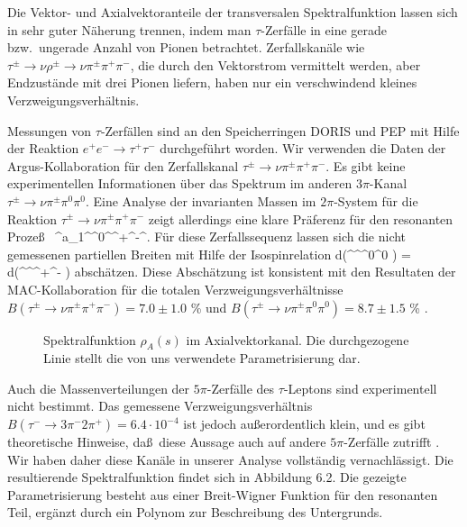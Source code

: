 Die Vektor- und Axialvektoranteile der transversalen 
Spektralfunktion lassen sich in sehr guter N\"aherung trennen, indem man 
$\tau$-Zerf\"alle in eine gerade bzw.~ungerade Anzahl von Pionen 
betrachtet. Zerfallskan\"ale wie $\tau^\pm\to\nu\rho^\pm\to
\nu\pi^\pm\pi^+\pi^-$, die durch den Vektorstrom vermittelt werden,
aber Endzust\"ande mit drei Pionen liefern, haben nur 
ein verschwindend kleines Verzweigungsverh\"altnis. 

Messungen von $\tau$-Zerf\"allen sind an den Speicherringen 
DORIS \cite{Alb86} und PEP \cite{Ruc86,Ban87} mit Hilfe
der Reaktion $e^+e^-\to\tau^+\tau^-$ durchgef\"uhrt worden.
Wir verwenden die Daten der Argus-Kollaboration \cite{Alb86}
f\"ur den Zerfallskanal $\tau^\pm\to\nu\pi^\pm\pi^+\pi^-$. 
Es gibt keine experimentellen Informationen \"uber das 
Spektrum im anderen $3\pi$-Kanal $\tau^\pm\to\nu\pi^\pm\pi^0\pi^0$.
Eine Analyse der invarianten Massen im $2\pi$-System f\"ur die
Reaktion $\tau^\pm\to\nu\pi^\pm\pi^+\pi^-$ \cite{Alb86}
zeigt allerdings eine klare Pr\"aferenz f\"ur den resonanten 
Proze\ss\
\be
  \tau^\pm\to \nu a_1^\pm \to \nu\rho^0\pi^\pm \to \nu\pi^+\pi^-\pi^\pm .
\ee
F\"ur diese Zerfallssequenz lassen sich die nicht gemessenen 
partiellen Breiten mit Hilfe der Isospinrelation 
\be
 d\Gamma (\tau^\pm\to\nu\pi^\pm\pi^0\pi^0 ) =
 d\Gamma (\tau^\pm\to\nu\pi^\pm\pi^+\pi^- ) 
\ee
absch\"atzen. Diese Absch\"atzung ist konsistent mit den Resultaten der 
MAC-Kollaboration \cite{Ban87} f\"ur die totalen Verzweigungsverh\"altnisse 
$B(\tau^\pm\to\nu\pi^\pm\pi^+\pi^-)=7.0\pm 1.0$ \% und $B(\tau^\pm\to\nu
\pi^\pm\pi^0\pi^0)=8.7\pm 1.5$ \% .
\begin{figure}
\caption{Spektralfunktion $\rho_A(s)$ im Axialvektorkanal.
Die durchgezogene Linie stellt die von uns verwendete 
Parametrisierung dar.}
\vspace{9cm}
\end{figure}

Auch die Massenverteilungen der $5\pi$-Zerf\"alle des $\tau$-Leptons
sind experimentell nicht bestimmt. Das gemessene Verzweigungsverh\"altnis
$B(\tau^-\to 3\pi^-2\pi^+)=6.4\cdot 10^{-4}$ \cite{Alb88} ist jedoch
au\ss erordentlich klein, und es gibt theoretische Hinweise, da\ss\ diese
Aussage auch auf  andere $5\pi$-Zerf\"alle zutrifft \cite{GR85}.
Wir haben daher diese Kan\"ale in unserer Analyse vollst\"andig 
vernachl\"assigt. Die resultierende Spektralfunktion findet sich in 
Abbildung 6.2. Die gezeigte Parametrisierung besteht aus einer 
Breit-Wigner Funktion f\"ur den resonanten Teil, erg\"anzt durch 
ein Polynom zur Beschreibung des Untergrunds. 

